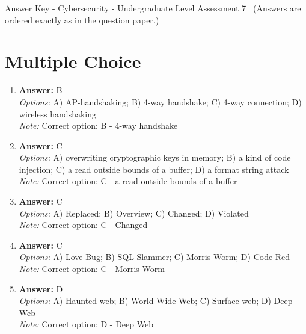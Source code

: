 \documentclass[12pt]{article}
\begin{document}
\begin{center}
Answer Key - Cybersecurity - Undergraduate Level Assessment 7 \
\small (Answers are ordered exactly as in the question paper.)
\end{center}

\section*{Multiple Choice}
\begin{enumerate}[label=\arabic*.]
\item \textbf{Answer:} B
\\ \textit{Options:} A) AP-handshaking; B) 4-way handshake; C) 4-way connection; D) wireless handshaking
\\ \textit{Note:} Correct option: B - 4-way handshake
\item \textbf{Answer:} C
\\ \textit{Options:} A) overwriting cryptographic keys in memory; B) a kind of code injection; C) a read outside bounds of a buffer; D) a format string attack
\\ \textit{Note:} Correct option: C - a read outside bounds of a buffer
\item \textbf{Answer:} C
\\ \textit{Options:} A) Replaced; B) Overview; C) Changed; D) Violated
\\ \textit{Note:} Correct option: C - Changed
\item \textbf{Answer:} C
\\ \textit{Options:} A) Love Bug; B) SQL Slammer; C) Morris Worm; D) Code Red
\\ \textit{Note:} Correct option: C - Morris Worm
\item \textbf{Answer:} D
\\ \textit{Options:} A) Haunted web; B) World Wide Web; C) Surface web; D) Deep Web
\\ \textit{Note:} Correct option: D - Deep Web
\end{enumerate}
\end{document}
